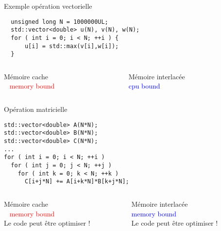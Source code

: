 \documentclass[handout,francais]{beamer}
\begin{document}
\begin{frame}[fragile]{Exemple opération vectorielle}
 \begin{lstlisting}
  unsigned long N = 1000000UL;
  std::vector<double> u(N), v(N), w(N);
  for ( int i = 0; i < N; ++i ) {
      u[i] = std::max(v[i],w[i]);
  }
 \end{lstlisting}

 \begin{columns}[t]
  \begin{column}{0.5\textwidth}
   \textcolor{green!25!black}{Mémoire cache} 
   \\ 
   \textcolor{red}{memory bound}
   \end{column}
   \begin{column}{0.5\textwidth}
   \textcolor{orange!25!black}{Mémoire interlacée}
   \\
   \textcolor{blue}{cpu bound}
  \end{column}
 \end{columns} 
\end{frame}

\begin{frame}[fragile]{Opération matricielle}
 \begin{lstlisting}
std::vector<double> A(N*N);
std::vector<double> B(N*N);
std::vector<double> C(N*N);
...
for ( int i = 0; i < N; ++i )
  for ( int j = 0; j < N; ++j )
    for ( int k = 0; k < N; ++k )
      C[i+j*N] += A[i+k*N]*B[k+j*N];
 \end{lstlisting}

 \begin{columns}[t]
  \begin{column}{0.5\textwidth}
   \textcolor{green!25!black}{Mémoire cache} 
   \\ 
   \textcolor{red}{memory bound}
   \\
   Le code peut être optimiser !
   \end{column}
   \begin{column}{0.5\textwidth}
   \textcolor{orange!25!black}{Mémoire interlacée}
   \\
   \textcolor{blue}{memory bound}
   \\
   Le code peut être optimiser !
  \end{column}
 \end{columns} 

\end{frame}
\end{document}
